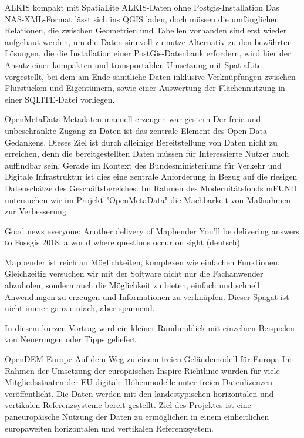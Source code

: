 %
{ALKIS kompakt mit SpatiaLite}%
{ALKIS-Daten ohne Postgis-Installation}%
{
Das NAS-XML-Format lässt sich ins QGIS laden, doch müssen die umfänglichen Relationen, die zwischen Geometrien und Tabellen vorhanden sind  erst wieder aufgebaut werden, um die Daten sinnvoll zu nutze
Alternativ zu den bewährten Lösungen, die die Installation einer PostGis-Datenbank erfordern, wird  hier der Ansatz einer kompakten und transportablen Umsetzung mit SpatiaLite vorgestellt, bei dem am Ende sämtliche Daten inklusive Verknüpfungen zwischen Flurstücken und Eigentümern, sowie einer Auswertung der Flächennutzung in einer SQLITE-Datei vorliegen.%
}

%
{OpenMetaData}%
{Metadaten manuell erzeugen war gestern}%
{
Der freie und unbeschränkte Zugang zu Daten ist das zentrale Element des Open Data Gedankens. Dieses Ziel ist durch alleinige Bereitstellung von Daten nicht zu erreichen, denn die bereitgestellten Daten müssen für Interessierte Nutzer auch auffindbar sein. Gerade im Kontext des Bundesministeriums für Verkehr und Digitale Infrastruktur ist dies eine zentrale Anforderung in Bezug auf die riesigen Datenschätze des Geschäftsbereiches. Im Rahmen des Modernitätsfonds mFUND untersuchen wir im Projekt "OpenMetaData" die Machbarkeit von Maßnahmen zur Verbesserung%
}

%
{Good news everyone: Another delivery of Mapbender}%
{You'll be delivering answers to Fossgis 2018, a world where questions occur on sight (deutsch)}%
{
Mapbender ist reich an Möglichkeiten, komplexen wie einfachen
Funktionen. Gleichzeitig versuchen wir mit der Software nicht nur die
Fachanwender abzuholen, sondern auch die Möglichkeit zu bieten, einfach und
schnell Anwendungen zu erzeugen und Informationen zu verknüpfen. Dieser
Spagat ist nicht immer ganz einfach, aber spannend.

In diesem kurzen Vortrag wird ein kleiner Rundumblick mit einzelnen
Beispielen von Neuerungen oder Tipps geliefert.%
}

%
{OpenDEM Europe }%
{Auf dem Weg zu einem freien Geländemodell für Europa}%
{
Im Rahmen der Umsetzung der europäischen Inspire Richtlinie wurden für viele Mitgliedsstaaten der EU digitale Höhenmodelle unter freien Datenlizenzen veröffentlicht. Die Daten werden mit den landestypischen horizontalen und vertikalen Referenzsysteme bereit gestellt. Ziel des Projektes ist eine paneuropäische Nutzung der Daten zu ermöglichen in einem einheitlichen europaweiten horizontalen und vertikalen Referenzsystem.%
}

